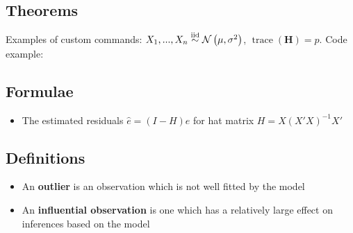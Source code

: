 \documentclass[letterpaper, 11pt]{article}
\let\b\mathbf
\newcommand{\normal}[2]{\mathcal{N}\left(#1,#2\right)}
\newcommand{\iid}{\stackrel{\smash{\text{iid}}}{\sim}}
\newcommand{\1}{\mathds{1}}	%
\DeclareMathOperator*{\trace}{trace}      %
\theoremstyle{definition}
\begin{document}
\subsection*{Theorems}
Examples of custom commands: $X_1,...,X_n\iid\normal{\mu}{\sigma^2}$, $\trace(\b{H})=p$. Code example:

\subsection*{Formulae}
\begin{itemize}
\item The estimated residuals $\hat{e} = (I-H)e$ for hat matrix $H = X(X'X)^{-1}X'$

\end{itemize}

\subsection*{Definitions}
\begin{itemize}
\item An \textbf{outlier} is an observation which is not well fitted by the model
\item An \textbf{influential observation} is one which has a relatively large effect on inferences based on the model
\end{itemize}

\end{document}

